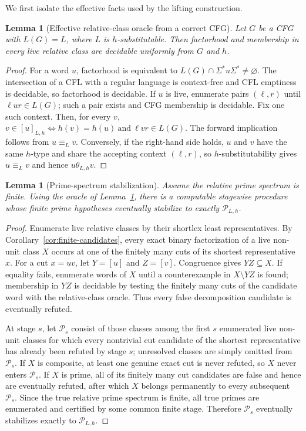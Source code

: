 \documentclass[11pt,a4paper]{article}
\newtheorem{lemma}[theorem]{Lemma}
\newcommand{\Pcal}{\mathcal P}
\begin{document}
We first isolate the effective facts used by the lifting construction.

\begin{lemma}[Effective relative-class oracle from a correct CFG]
\label{lem:fsrp-class-oracle}
Let $G$ be a CFG with $L(G)=L$, where $L$ is $h$-substitutable.  Then factorhood and membership in every live relative class are decidable uniformly from $G$ and $h$.
\end{lemma}

\begin{proof}
For a word $u$, factorhood is equivalent to
\(L(G)\cap\Sigma^*u\Sigma^*\ne\varnothing.\)
The intersection of a CFL with a regular language is context-free and CFL emptiness is decidable, so factorhood is decidable.  If $u$ is live, enumerate pairs $(\ell,r)$ until $\ell ur\in L(G)$; such a pair exists and CFG membership is decidable.  Fix one such context.  Then, for every $v$,
\(v\in[u]_{L,h} \iff h(v)=h(u)\ \text{and}\ \ell vr\in L(G).\)
The forward implication follows from $u\equiv_Lv$.  Conversely, if the right-hand side holds, $u$ and $v$ have the same $h$-type and share the accepting context $(\ell,r)$, so $h$-substitutability gives $u\equiv_Lv$ and hence $u\theta_{L,h}v$.
\end{proof}

\begin{lemma}[Prime-spectrum stabilization]
\label{lem:fsrp-prime-stabilization}
Assume the relative prime spectrum is finite.  Using the oracle of Lemma~\ref{lem:fsrp-class-oracle}, there is a computable stagewise procedure whose finite prime hypotheses eventually stabilize to exactly $\Pcal_{L,h}$.
\end{lemma}

\begin{proof}
Enumerate live relative classes by their shortlex least representatives.  By Corollary~\ref{cor:finite-candidates}, every exact binary factorization of a live non-unit class $X$ occurs at one of the finitely many cuts of its shortest representative $x$.  For a cut $x=uv$, let $Y=[u]$ and $Z=[v]$.  Congruence gives $YZ\subseteq X$.  If equality fails, enumerate words of $X$ until a counterexample in $X\setminus YZ$ is found; membership in $YZ$ is decidable by testing the finitely many cuts of the candidate word with the relative-class oracle.  Thus every false decomposition candidate is eventually refuted.

At stage $s$, let $\Pcal_s$ consist of those classes among the first $s$ enumerated live non-unit classes for which every nontrivial cut candidate of the shortest representative has already been refuted by stage $s$; unresolved classes are simply omitted from $\Pcal_s$.  If $X$ is composite, at least one genuine exact cut is never refuted, so $X$ never enters $\Pcal_s$.  If $X$ is prime, all of its finitely many cut candidates are false and hence are eventually refuted, after which $X$ belongs permanently to every subsequent $\Pcal_s$.  Since the true relative prime spectrum is finite, all true primes are enumerated and certified by some common finite stage.  Therefore $\Pcal_s$ eventually stabilizes exactly to $\Pcal_{L,h}$.
\end{proof}
\end{document}
